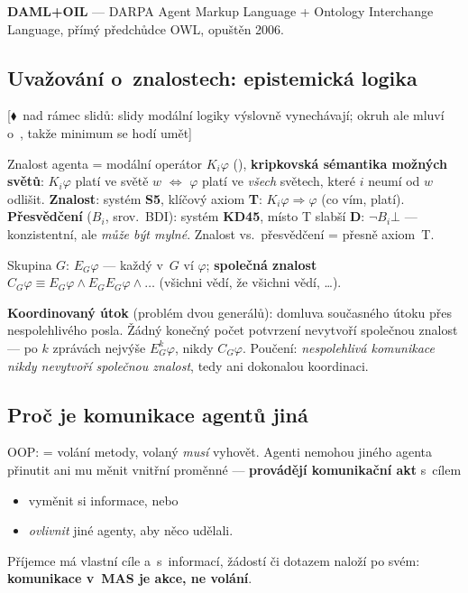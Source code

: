 \documentclass[11pt,a4paper]{article}
\theoremstyle{definition}
\newcommand{\mimoq}[1]{\textcolor{markcol}{\textsf{\footnotesize[$\blacklozenge$~nad rámec slidů: #1]}}}
\begin{document}
\textbf{DAML+OIL} --- DARPA Agent Markup Language + Ontology Interchange Language, přímý
předchůdce OWL, opuštěn 2006.

\subsection{Uvažování o~znalostech: epistemická logika}

\noindent\mimoq{slidy modální logiky výslovně vynechávají; okruh ale mluví o~\uv{znalostech
v~MAS}, takže minimum se hodí umět}

\begin{defbox}
Znalost agenta = modální operátor $K_i\varphi$ (),
\textbf{kripkovská sémantika možných světů}: $K_i\varphi$ platí ve světě $w$ $\iff$ $\varphi$
platí ve \emph{všech} světech, které $i$ neumí od $w$ odlišit.
\textbf{Znalost}: systém \textbf{S5}, klíčový axiom \textbf{T}: $K_i\varphi \Rightarrow \varphi$
(co vím, platí). \textbf{Přesvědčení} ($B_i$, srov.\ BDI): systém \textbf{KD45}, místo T slabší
\textbf{D}: $\neg B_i\bot$ --- konzistentní, ale \emph{může být mylné}. Znalost vs.\
přesvědčení = přesně axiom~T.

Skupina $G$: $E_G\varphi$ --- každý v~$G$ ví $\varphi$; \textbf{společná znalost}
$C_G\varphi \equiv E_G\varphi \wedge E_G E_G\varphi \wedge \dots$ (všichni vědí, že všichni
vědí, \dots).

\textbf{Koordinovaný útok} (problém dvou generálů): domluva současného útoku přes
nespolehlivého posla. Žádný konečný počet potvrzení nevytvoří společnou znalost --- po $k$
zprávách nejvýše $E_G^k\varphi$, nikdy $C_G\varphi$. Poučení: \emph{nespolehlivá komunikace
nikdy nevytvoří společnou znalost}, tedy ani dokonalou koordinaci.
\end{defbox}
\subsection{Proč je komunikace agentů jiná}

OOP:  = volání metody, volaný \emph{musí} vyhovět. Agenti nemohou jiného agenta
přinutit ani mu měnit vnitřní proměnné --- \textbf{provádějí komunikační akt} s~cílem
\begin{itemize}
\item vyměnit si informace, nebo
\item \emph{ovlivnit} jiné agenty, aby něco udělali.
\end{itemize}
Příjemce má vlastní cíle a~s~informací, žádostí či dotazem naloží po svém:
\textbf{komunikace v~MAS je akce, ne volání}.
\end{document}
